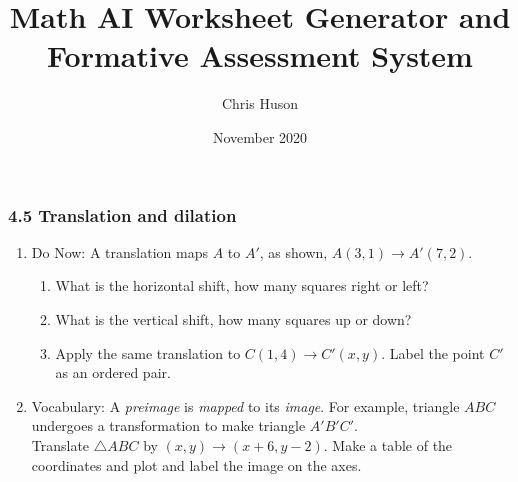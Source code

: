\documentclass[12pt, twoside]{article}
\title{Math AI Worksheet Generator and Formative Assessment System}
\author{Chris Huson}
\date{November 2020}
\begin{document}
\subsubsection*{4.5 Translation and dilation}
\begin{enumerate}

\item Do Now: A translation maps $A$ to $A'$, as shown, $A(3,1) \rightarrow A'(7,2)$.
\begin{multicols}{2}
  \begin{enumerate}
    \item What is the horizontal shift, how many squares right or left? \vspace{1.25cm}
    \item What is the vertical shift, how many squares up or down? \vspace{1.25cm}
    \item Apply the same translation to $C(1,4)\rightarrow C'(x,y)$. Label the point $C'$ as an ordered pair.
    \end{enumerate}
    \begin{flushright}
    \end{flushright}
\end{multicols}

\newpage
\item Vocabulary: A \emph{preimage} is \emph{mapped} to its \emph{image}. For example, triangle $ABC$ undergoes a transformation to make triangle $A'B'C'$.\\[0.5cm]
Translate $\triangle ABC$ by $(x,y) \rightarrow (x+6, y-2)$. Make a table of the coordinates and plot and label the image on the axes.
\begin{flushright}
\end{flushright}


\end{enumerate}
\end{document}
